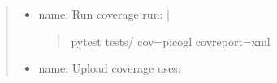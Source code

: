 \documentclass[a4paper,10pt,english,openany,oneside]{sphinxmanual}
\begin{document}
\begin{quote}
\begin{description}
\begin{description}
\begin{itemize}
\begin{quote}
\sphinxAtStartPar
python \sphinxhyphen{}m unittest discover tests
\end{quote}

\item {} 
\sphinxAtStartPar
name: Run coverage
run: |
\begin{quote}

\sphinxAtStartPar
pytest tests/ \textendash{}cov=picogl \textendash{}cov\sphinxhyphen{}report=xml
\end{quote}

\item {} 
\sphinxAtStartPar
name: Upload coverage
uses: 

\end{itemize}

\end{description}

\end{description}
\end{quote}
\end{document}
